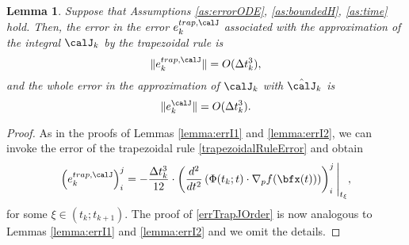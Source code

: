 \documentclass[DIV=12]{scrartcl} %
\newcommand{\err}{\ensuremath{e}}
\newtheorem{lemma}{Lemma}
\theoremstyle{definition}
\begin{document}
\begin{lemma}
\label{lemma:errJOrder}
Suppose that Assumptions \ref{as:errorODE}, \ref{as:boundedH}, \ref{as:time} hold. Then, the error in the error $\err_k^{trap,\calJ}$ associated with the approximation of the integral $\calJ_k$ by the trapezoidal rule is
\begin{equation}
    \label{errTrapJOrder}
    \|\err_k^{trap,\calJ}\|=O(\Delta t_k^3),
\end{equation}
and the whole error in the approximation of $\calJ_k$ with $\hat{\calJ}_k$ is
\begin{equation}
    \label{errJOrder}
    \|\err_k^{\calJ}\|=O(\Delta t_k^3).
\end{equation}
\end{lemma}
\begin{proof}
As in the proofs of Lemmas \ref{lemma:errI1} and \ref{lemma:errI2}, we can invoke the error of the trapezoidal rule \eqref{trapezoidalRuleError} and obtain
\begin{align*}
    \left(\err_k^{trap,\calJ}\right)_i^j=-\frac{\Delta t_k^3}{12}\cdot\left(\frac{d^2}{dt^2}\left(\Phi(t_k;t)\cdot\nabla_pf(\bfx(t))\right)\right)_i^j\Bigg|_{t_{\xi}},
\end{align*}
for some $\xi\in(t_k;t_{k+1})$. The proof of \eqref{errTrapJOrder} is now analogous to Lemmas \ref{lemma:errI1} and \ref{lemma:errI2} and we omit the details.



\end{proof}
\end{document}
